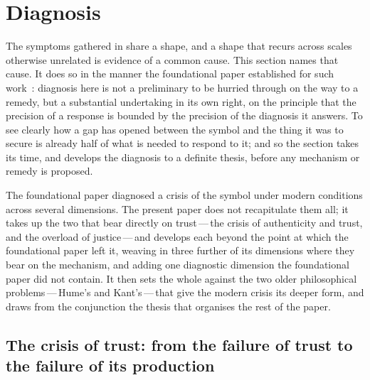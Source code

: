 \section{Diagnosis}
\label{p13:sec:diagnosis}

\noindent
The symptoms gathered in  share a shape, and a shape that recurs across scales otherwise unrelated is evidence of a common cause. This section names that cause. It does so in the manner the foundational paper established for such work~\parencite{wanhong_grb}: diagnosis here is not a preliminary to be hurried through on the way to a remedy, but a substantial undertaking in its own right, on the principle that the precision of a response is bounded by the precision of the diagnosis it answers. To see clearly how a gap has opened between the symbol and the thing it was to secure is already half of what is needed to respond to it; and so the section takes its time, and develops the diagnosis to a definite thesis, before any mechanism or remedy is proposed.

The foundational paper diagnosed a crisis of the symbol under modern conditions across several dimensions. The present paper does not recapitulate them all; it takes up the two that bear directly on trust\,---\,the crisis of authenticity and trust, and the overload of justice\,---\,and develops each beyond the point at which the foundational paper left it, weaving in three further of its dimensions where they bear on the mechanism, and adding one diagnostic dimension the foundational paper did not contain. It then sets the whole against the two older philosophical problems\,---\,Hume's and Kant's\,---\,that give the modern crisis its deeper form, and draws from the conjunction the thesis that organises the rest of the paper.

\subsection{The crisis of trust: from the failure of trust to the failure of its production}
\label{p13:sub:diag-trust}

